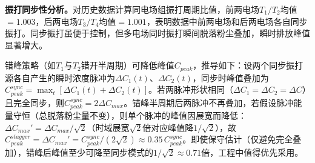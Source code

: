 \textbf{振打同步性分析。}对历史数据计算同电场组振打周期比值，前两电场$T_1/T_2$均值$=1.003$，后两电场$T_3/T_4$均值$=1.001$，表明数据中前两电场和后两电场各自同步振打。同步振打虽便于控制，但多电场同时振打瞬间脱落粉尘叠加，瞬时排放峰值显著增大。

错峰策略（如$T_1$与$T_2$错开半周期）可降低峰值$C_{peak}$，推导如下：设两个同步振打源各自产生的瞬时浓度脉冲为$\Delta C_1(t)$、$\Delta C_2(t)$，同步时峰值叠加为$C_{peak}^{sync}=\max_t[\Delta C_1(t)+\Delta C_2(t)]$。若两脉冲形状相同（$\Delta C_1=\Delta C_2=\Delta C$）且完全同步，则$C_{peak}^{sync}=2\Delta C_{max}$。错峰半周期后两脉冲不再叠加，若假设脉冲能量守恒（总脱落粉尘量不变），则单个脉冲的峰值因展宽而降低：$\Delta C_{max}' = \Delta C_{max}/\sqrt{2}$（时域展宽$\sqrt{2}$倍对应峰值降$1/\sqrt{2}$），故$C_{peak}^{stagger}=\Delta C_{max}' = C_{peak}^{sync}/(2\sqrt{2}) \approx 0.35\,C_{peak}^{sync}$。即使保守估计（仅避免完全叠加），错峰后峰值至少可降至同步模式的$1/\sqrt{2}\approx 0.71$倍，工程中值得优先采用。
